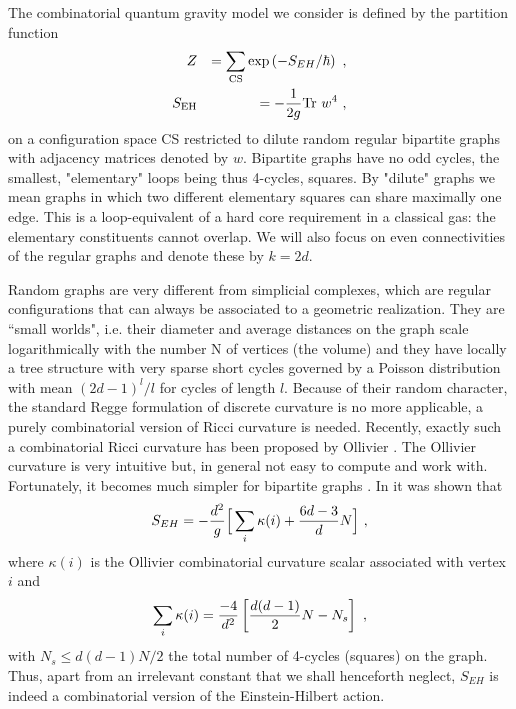 \documentclass[twocolumn,
preprintnumbers,amsmath,amssymb]{revtex4}
\begin{document}
The combinatorial quantum gravity model we consider is defined by the partition function 
\begin{eqnarray}
Z &&= \sum_{\rm CS} {\rm exp} \left( -S_{EH}/\hbar \right) \ ,
\nonumber \\
S_{\rm EH} &&= - {1\over 2g} {\rm Tr}\  w^4  \ ,
\label{new1}
\end{eqnarray}
on a configuration space CS restricted to dilute random regular bipartite graphs with adjacency matrices denoted by $w$. Bipartite graphs have no odd cycles, the smallest, "elementary" loops being thus 4-cycles, squares. By "dilute" graphs we mean graphs in which two different elementary squares can share maximally one edge. This is a loop-equivalent  of a hard core requirement in a classical gas: the elementary constituents cannot overlap.
We will also focus on even connectivities of the regular graphs and denote these by $k=2d$.

Random graphs are very different from simplicial complexes, which are regular configurations that can always be associated to a geometric realization. They are ``small worlds", i.e. their diameter and average distances on the graph scale logarithmically with the number N of vertices (the volume) and they have locally a tree structure with very sparse short cycles governed by a Poisson distribution \cite{wormald} with mean $(2d-1)^l/l$ for cycles of length $l$. Because of their random character, the standard Regge formulation of discrete curvature \cite{regge} is no more applicable, a purely combinatorial version of Ricci curvature is needed. Recently, exactly such a combinatorial Ricci curvature has been proposed by Ollivier \cite{olli1}. The Ollivier curvature is very intuitive but, in general not easy to compute and work with. Fortunately, it becomes much simpler for bipartite graphs \cite{olli2}. In \cite{tru2} it was shown that 
\begin{equation}
S_{EH} = -{d^2\over g} \Big[ \sum_i \kappa (i) + {6d-3\over d} N \Big] \ ,
\label{einstein}
\end{equation}
where $\kappa(i)$ is the Ollivier combinatorial curvature scalar associated with vertex $i$ and 
\begin{equation}
\sum_i \kappa (i) = {-4\over d^2} \left[ {d(d-1)\over 2} N-N_s \right] \ ,
\label{totcursca}
\end{equation}
with $N_s\le d(d-1)N/2$ the total number of 4-cycles (squares) on the graph. Thus, apart from an irrelevant constant that we shall henceforth neglect, $S_{EH}$ is indeed a combinatorial version of the Einstein-Hilbert action. 
\end{document}
